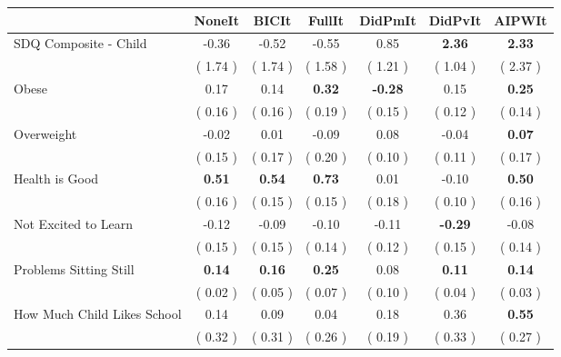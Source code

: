 \begin{tabular}{l c c c c c c}
\toprule
 & NoneIt & BICIt & FullIt & DidPmIt & DidPvIt & AIPWIt \\
\midrule
SDQ Composite - Child &     -0.36 &     -0.52 &     -0.55 &      0.85 & \textbf{      2.36 } & \textbf{     2.33} \\
& (     1.74 ) & (     1.74 ) & (     1.58 ) & (     1.21 ) & (     1.04 ) & (     2.37 ) \\
Obese &      0.17 &      0.14 & \textbf{      0.32 } & \textbf{     -0.28 } &      0.15 & \textbf{     0.25} \\
& (     0.16 ) & (     0.16 ) & (     0.19 ) & (     0.15 ) & (     0.12 ) & (     0.14 ) \\
Overweight &     -0.02 &      0.01 &     -0.09 &      0.08 &     -0.04 & \textbf{     0.07} \\
& (     0.15 ) & (     0.17 ) & (     0.20 ) & (     0.10 ) & (     0.11 ) & (     0.17 ) \\
Health is Good & \textbf{      0.51 } & \textbf{      0.54 } & \textbf{      0.73 } &      0.01 &     -0.10 & \textbf{     0.50} \\
& (     0.16 ) & (     0.15 ) & (     0.15 ) & (     0.18 ) & (     0.10 ) & (     0.16 ) \\
Not Excited to Learn &     -0.12 &     -0.09 &     -0.10 &     -0.11 & \textbf{     -0.29 } &     -0.08 \\
& (     0.15 ) & (     0.15 ) & (     0.14 ) & (     0.12 ) & (     0.15 ) & (     0.14 ) \\
Problems Sitting Still & \textbf{      0.14 } & \textbf{      0.16 } & \textbf{      0.25 } &      0.08 & \textbf{      0.11 } & \textbf{     0.14} \\
& (     0.02 ) & (     0.05 ) & (     0.07 ) & (     0.10 ) & (     0.04 ) & (     0.03 ) \\
How Much Child Likes School &      0.14 &      0.09 &      0.04 &      0.18 &      0.36 & \textbf{     0.55} \\
& (     0.32 ) & (     0.31 ) & (     0.26 ) & (     0.19 ) & (     0.33 ) & (     0.27 ) \\
\bottomrule
\end{tabular}
